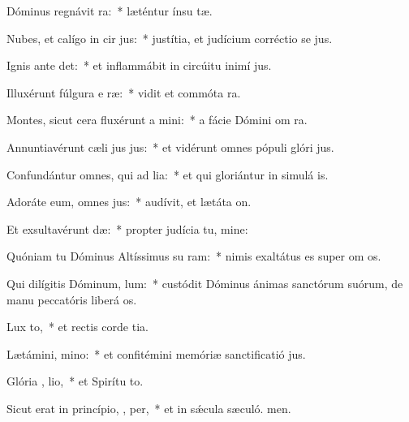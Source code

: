 \item Dóminus regnávit  ra:~* læténtur ínsu tæ.
\item Nubes, et calígo in cir jus:~* justítia, et judícium corréctio se jus.
\item Ignis ante  det:~* et inflammábit in circúitu inimí jus.
\item Illuxérunt fúlgura e  ræ:~* vidit et commóta  ra.
\item Montes, sicut cera fluxérunt a  mini:~* a fácie Dómini om ra.
\item Annuntiavérunt cæli jus jus:~* et vidérunt omnes pópuli glóri jus.
\item Confundántur omnes, qui ad lia:~* et qui gloriántur in simulá is.
\item Adoráte eum, omnes  jus:~* audívit, et lætáta  on.
\item Et exsultavérunt  dæ:~* propter judícia tu, mine:
\item Quóniam tu Dóminus Altíssimus su  ram:~* nimis exaltátus es super om os.
\item Qui dilígitis Dóminum,  lum:~* custódit Dóminus ánimas sanctórum suórum, de manu peccatóris liberá os.
\item Lux   to,~* et rectis corde tia.
\item Lætámini,   mino:~* et confitémini memóriæ sanctificatió jus.
\item Glória ,  lio,~* et Spirítu to.
\item Sicut erat in princípio,  ,  per,~* et in sǽcula sæculó. men.
